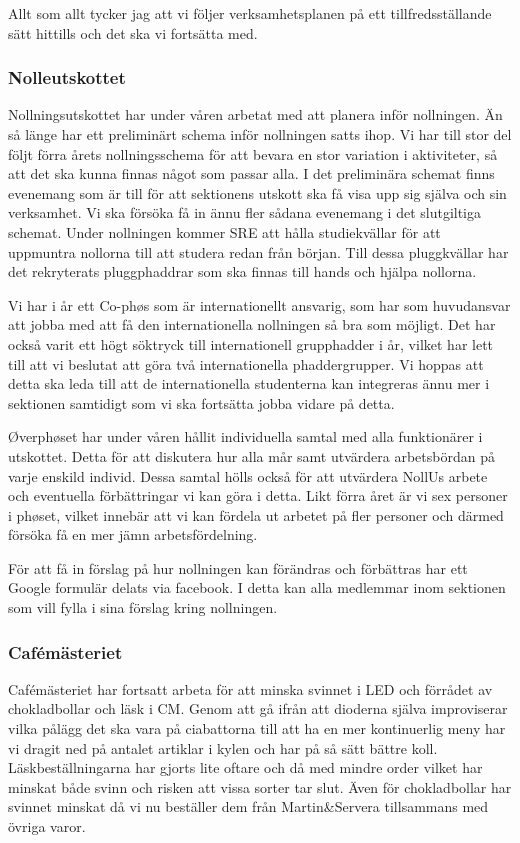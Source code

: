\documentclass[../_main/handlingar.tex]{subfiles}
\begin{document}
Allt som allt tycker jag att vi följer verksamhetsplanen på ett tillfredsställande sätt hittills och det ska vi fortsätta med.

\newpage
\subsubsection*{Nolleutskottet}
Nollningsutskottet har under våren arbetat med att planera inför nollningen. Än så länge har ett preliminärt schema inför nollningen satts ihop. Vi har till stor del följt förra årets nollningsschema för att bevara en stor variation i aktiviteter, så att det ska kunna finnas något som passar alla. I det preliminära schemat finns evenemang som är till för att sektionens utskott ska få visa upp sig själva och sin verksamhet. Vi ska försöka få in ännu fler sådana evenemang i det slutgiltiga schemat. Under nollningen kommer SRE att hålla studiekvällar för att uppmuntra nollorna till att studera redan från början. Till dessa pluggkvällar har det rekryterats pluggphaddrar som ska finnas till hands och hjälpa nollorna. 

Vi har i år ett Co-phøs som är internationellt ansvarig, som har som huvudansvar att jobba med att få den internationella nollningen så bra som möjligt. Det har också varit ett högt söktryck till internationell grupphadder i år, vilket har lett till att vi beslutat att göra två internationella phaddergrupper. Vi hoppas att detta ska leda till att de internationella studenterna kan integreras ännu mer i sektionen samtidigt som vi ska fortsätta jobba vidare på detta.

Øverphøset har under våren hållit individuella samtal med alla funktionärer i utskottet. Detta för att diskutera hur alla mår samt utvärdera arbetsbördan på varje enskild individ. Dessa samtal hölls också för att utvärdera NollUs arbete och eventuella förbättringar vi kan göra i detta. Likt förra året är vi sex personer i phøset, vilket innebär att vi kan fördela ut arbetet på fler personer och därmed försöka få en mer jämn arbetsfördelning. 

För att få in förslag på hur nollningen kan förändras och förbättras har ett Google formulär delats via facebook. I detta kan alla medlemmar inom sektionen som vill fylla i sina förslag kring nollningen.

\subsubsection*{Cafémästeriet}
Cafémästeriet har fortsatt arbeta för att minska svinnet i LED och förrådet av chokladbollar och läsk i CM. Genom att gå ifrån att dioderna själva improviserar vilka pålägg det ska vara på ciabattorna till att ha en mer kontinuerlig meny har vi dragit ned på antalet artiklar i kylen och har på så sätt bättre koll. Läskbeställningarna har gjorts lite oftare och då med mindre order vilket har minskat både svinn och risken att vissa sorter tar slut. Även för chokladbollar har svinnet minskat då vi nu beställer dem från Martin\&Servera tillsammans med övriga varor. 
\end{document}
